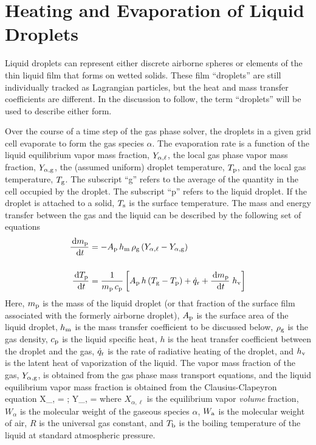 \section{Heating and Evaporation of Liquid Droplets}

Liquid droplets can represent either discrete airborne spheres or elements of the thin liquid film that forms on wetted solids. These film ``droplets'' are still individually tracked as Lagrangian particles, but the heat and mass transfer coefficients are different. In the discussion to follow, the term ``droplets'' will be used to describe either form.

Over the course of a time step of the gas phase solver, the droplets in a given grid cell evaporate to form the gas species $\alpha$. The evaporation rate is a function of the liquid equilibrium vapor mass fraction, $Y_{\rm \alpha,\ell}$, the local gas phase vapor mass fraction, $Y_{\rm \alpha,g}$, the (assumed uniform) droplet temperature, $T_{\rm p}$, and the local gas temperature, $T_{\rm g}$. The subscript ``g'' refers to the average of the quantity in the cell occupied by the droplet. The subscript ``p'' refers to the liquid droplet. If the droplet is attached to a solid, $T_{\rm s}$ is the surface temperature. The mass and energy transfer between the gas and the liquid can be described by the following set of equations~\cite{Cheremisinoff:1}
\begin{align}
\frac{\,\mathrm{d} m_{\rm p}}{\,\mathrm{d} t} & = - A_{\rm p} \, h_{\rm m} \, \rho_{\rm g} \, (Y_{\alpha,\ell} - Y_{\rm \alpha, g}) \\[0.2in]
\frac{\,\mathrm{d} T_{\rm p}}{\,\mathrm{d} t} & = \frac{1}{m_{\rm p} \, c_{\rm p}}  \left[ A_{\rm p} \, h  \, (T_{\rm g}-T_{\rm p}) + \dot{q}_{\rm r} + \frac{\,\mathrm{d} m_{\rm p}}{\,\mathrm{d} t} \; h_{\rm v} \right] \label{droplet_temp}
\end{align}
Here, $m_{\rm p}$ is the mass of the liquid droplet (or that fraction of the surface film associated with the formerly airborne droplet), $A_{\rm p}$ is the surface area of the liquid droplet, $h_{\rm m}$ is the mass transfer coefficient to be discussed below, $\rho_{\rm g}$ is the gas density, $c_{\rm p}$ is the liquid specific heat, $h$ is the heat transfer coefficient between the droplet and the gas, $\dot{q}_{\rm r}$ is the rate of radiative heating of the droplet, and $h_{\rm v}$ is the latent heat of vaporization of the liquid. The vapor mass fraction of the gas, $Y_{\rm \alpha,g}$, is obtained from the gas phase mass transport equations, and the liquid equilibrium vapor mass fraction is obtained from the Clausius-Clapeyron equation
\be X_{\rm \alpha,\ell} = \exp {}  \quad ; \quad
      Y_{\rm \alpha,\ell} =   \label{clausius_clapeyron} \ee
where $X_{\alpha,\ell}$ is the equilibrium vapor {\em volume} fraction, $W_{\alpha}$ is the molecular weight of the gaseous species $\alpha$, $W_{\rm a}$ is the molecular weight of air, $R$ is the universal gas constant, and $T_{\rm b}$ is the boiling temperature of the liquid at standard atmospheric pressure.

